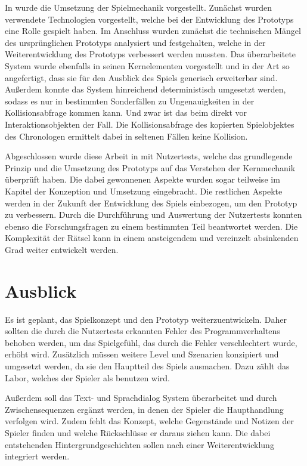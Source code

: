 In  wurde die Umsetzung der Spielmechanik vorgestellt. Zunächst wurden verwendete Technologien vorgestellt, welche bei der Entwicklung des Prototyps eine Rolle gespielt haben. Im Anschluss wurden zunächst die technischen Mängel des ursprünglichen Prototyps analysiert und festgehalten, welche in der Weiterentwicklung des Prototyps verbessert werden mussten. Das überarbeitete System wurde ebenfalls in seinen Kernelementen vorgestellt und in der Art so angefertigt, dass sie für den Ausblick des Spiels generisch erweiterbar sind.
Außerdem konnte das System hinreichend deterministisch umgesetzt werden, sodass es nur in bestimmten Sonderfällen zu Ungenauigkeiten in der Kollisionsabfrage kommen kann. Und zwar ist das beim  direkt vor Interaktionsobjekten der Fall. Die Kollisionsabfrage des kopierten Spielobjektes des Chronologen ermittelt dabei in seltenen Fällen keine Kollision.

Abgeschlossen wurde diese Arbeit in  mit Nutzertests, welche das grundlegende Prinzip und die Umsetzung des Prototyps auf das Verstehen der Kernmechanik überprüft haben. Die dabei gewonnenen Aspekte wurden sogar teilweise im Kapitel der Konzeption und Umsetzung eingebracht. Die restlichen Aspekte werden in der Zukunft der Entwicklung des Spiels einbezogen, um den Prototyp zu verbessern. Durch die Durchführung und Auswertung der Nutzertests konnten ebenso die Forschungsfragen zu einem bestimmten Teil beantwortet werden. Die Komplexität der Rätsel kann in einem ansteigendem und vereinzelt absinkenden Grad weiter entwickelt werden.

\section{Ausblick}\label{sec:ausblick}
Es ist geplant, das Spielkonzept und den Prototyp weiterzuentwickeln. Daher sollten die durch die Nutzertests erkannten Fehler des Programmverhaltens behoben werden, um das Spielgefühl, das durch die Fehler verschlechtert wurde, erhöht wird.
Zusätzlich müssen weitere Level und Szenarien konzipiert und umgesetzt werden, da sie den Hauptteil des Spiels ausmachen. Dazu zählt das Labor, welches der Spieler als  benutzen wird.

Außerdem soll das Text- und Sprachdialog System überarbeitet und durch Zwischensequenzen ergänzt werden, in denen der Spieler die Haupthandlung verfolgen wird. Zudem fehlt das Konzept, welche Gegenstände und Notizen der Spieler finden und welche Rückschlüsse er daraus ziehen kann. Die dabei entstehenden Hintergrundgeschichten sollen nach einer Weiterentwicklung integriert werden.

